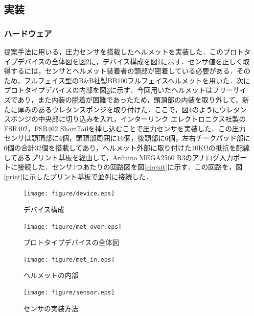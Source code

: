 \documentclass[Japanese]{dicomopapers}
\begin{document}
\subsection{実装}
\subsubsection{ハードウェア}
提案手法に用いる，圧力センサを搭載したヘルメットを実装した．このプロトタイプデバイスの全体図を図\ref{met_over}に，デバイス構成を図\ref{device}に示す．センサ値を正しく取得するには，センサとヘルメット装着者の頭部が密着している必要がある．そのため，フルフェイス型のB\&B社製BB100フルフェイスヘルメットを用いた．次にプロトタイプデバイスの内部を図\ref{met_in}に示す．今回用いたヘルメットはフリーサイズであり，また内装の脱着が困難であったため，頭頂部の内装を取り外して，新たに厚みのあるウレタンスポンジを取り付けた．ここで，図\ref{sensor}のようにウレタンスポンジの中央部に切り込みを入れ，インターリンク エレクトロニクス社製のFSR402，FSR402 ShortTailを挿し込むことで圧力センサを実装した．この圧力センサは頭頂部に4個，頭頂部周囲に16個，後頭部に6個，左右チークパッド部に6個の合計32個を搭載してあり，ヘルメット外部に取り付けた10KΩの抵抗を配線してあるプリント基板を経由して，Arduino MEGA2560 R3のアナログ入力ポートに接続した．センサ1つあたりの回路図を図\ref{circuit}に示す．この回路を，図\ref{print}に示したプリント基板で並列に接続した．

\begin{figure}[!t]
  \begin{center}
    \texttt{[image: figure/device.eps]}
  \end{center}
  \caption{デバイス構成}
  \label{device}
\end{figure}

\begin{figure}[!t]
  \begin{center}
    \texttt{[image: figure/met\_over.eps]}
  \end{center}
  \caption{プロトタイプデバイスの全体図}
  \label{met_over}
\end{figure}

\begin{figure}[!t]
  \begin{center}
    \texttt{[image: figure/met\_in.eps]}
  \end{center}
  \caption{ヘルメットの内部}
  \label{met_in}
\end{figure}

\begin{figure}[!t]
  \begin{center}
    \texttt{[image: figure/sensor.eps]}
  \end{center}
  \caption{センサの実装方法}
  \label{sensor}
\end{figure}
\end{document}
